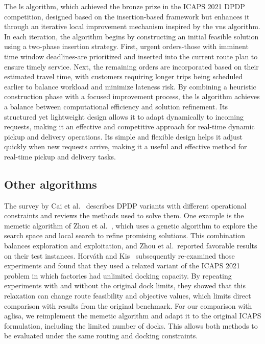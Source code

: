 \documentclass[pdflatex]{sn-jnl}
\begin{document}
The \gls{ls} algorithm, which achieved the bronze prize in the ICAPS 2021 DPDP competition, designed based on the insertion-based framework but enhances it through an iterative local improvement mechanism inspired by the \gls{vns} algorithm. In each iteration, the algorithm begins by constructing an initial feasible solution using a two-phase insertion strategy. First, urgent orders-those with imminent time window deadlines-are prioritized and inserted into the current route plan to ensure timely service. Next, the remaining orders are incorporated based on their estimated travel time, with customers requiring longer trips being scheduled earlier to balance workload and minimize lateness risk.
By combining a heuristic construction phase with a focused improvement process, the \gls{ls} algorithm achieves a balance between computational efficiency and solution refinement. Its structured yet lightweight design allows it to adapt dynamically to incoming requests, making it an effective and competitive approach for real-time dynamic pickup and delivery operations. Its simple and flexible design helps it adjust quickly when new requests arrive, making it a useful and effective method for real-time pickup and delivery tasks.

\subsection{Other algorithms}
\label{sec:other_algo}

The survey by Cai et al.~\cite{cai2023survey} describes DPDP variants with different operational constraints and reviews the methods used to solve them.
One example is the memetic algorithm of Zhou et al.~\cite{zhou2024memetic}, which uses a genetic algorithm to explore the search space and local search to refine promising solutions.
This combination balances exploration and exploitation, and Zhou et al.\ reported favorable results on their test instances.
Horv\'ath and Kis~\cite{horvath2025recent} subsequently re-examined those experiments and found that they used a relaxed variant of the ICAPS 2021 problem in which factories had unlimited docking capacity.
By repeating experiments with and without the original dock limits, they showed that this relaxation can change route feasibility and objective values, which limits direct comparison with results from the original benchmark.
For our comparison with \gls{aglisa}, we reimplement the memetic algorithm and adapt it to the original ICAPS formulation, including the limited number of docks.
This allows both methods to be evaluated under the same routing and docking constraints.
\end{document}
